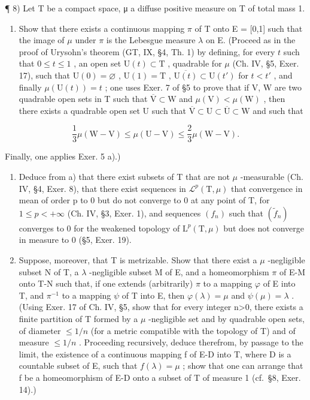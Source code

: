 ¶ 8) Let T be a compact space, μ a diffuse positive measure on T of total mass 1.

\begin{enumerate}
\def\labelenumi{\alph{enumi})}
\tightlist
\item
  Show that there exists a continuous mapping \(\pi\) of T onto E = {[}0,1{]} such that the image of \(\mu\) under \(\pi\) is the Lebesgue measure \(\lambda\) on E. (Proceed as in the proof of Urysohn's theorem (GT, IX, §4, Th. 1) by defining, for every \(t\) such that \(0 \leqslant t \leqslant 1\) , an open set \(\mathrm{U}(t) \subset \mathrm{T}\) , quadrable for \(\mu\) (Ch. IV, §5, Exer. 17), such that \(\mathrm{U}(0) = \varnothing\) , \(\mathrm{U}(1) = \mathrm{T}\) , \(\overline{\mathrm{U}(t)} \subset \mathrm{U}(t')\) for \(t < t'\) , and finally \(\mu(\mathrm{U}(t)) = t\) ; one uses Exer. 7 of §5 to prove that if V, W are two quadrable open sets in T such that \(\overline{\mathrm{V}} \subset \mathrm{W}\) and \(\mu(\mathrm{V}) < \mu(\mathrm{W})\) , then there exists a quadrable open set U such that \(\overline{\mathrm{V}} \subset \mathrm{U} \subset \overline{\mathrm{U}} \subset \mathrm{W}\) and such that
\end{enumerate}

\[
\frac {1}{3} \mu (\mathrm{W-V}) \leqslant \mu (\mathrm{U-V}) \leqslant \frac {2}{3} \mu (\mathrm{W-V}).
\]

Finally, one applies Exer. 5 a).)

\begin{enumerate}
\def\labelenumi{\alph{enumi})}
\setcounter{enumi}{1}
\item
  Deduce from a) that there exist subsets of T that are not \(\mu\) -measurable (Ch. IV, §4, Exer. 8), that there exist sequences in \(\mathcal{L}^{p}(\mathrm{T},\mu)\) that convergence in mean of order p to 0 but do not converge to 0 at any point of T, for \(1 \leqslant p < +\infty\) (Ch. IV, §3, Exer. 1), and sequences \((f_{n})\) such that \((\widetilde{f}_{n})\) converges to 0 for the weakened topology of \(\mathrm{L}^{p}(\mathrm{T},\mu)\) but does not converge in measure to 0 (§5, Exer. 19).
\item
  Suppose, moreover, that T is metrizable. Show that there exist a \(\mu\) -negligible subset N of T, a \(\lambda\) -negligible subset M of E, and a homeomorphism \(\pi\) of E-M onto T-N such that, if one extends (arbitrarily) \(\pi\) to a mapping \(\varphi\) of E into T, and \(\pi^{-1}\) to a mapping \(\psi\) of T into E, then \(\varphi(\lambda)=\mu\) and \(\psi(\mu)=\lambda\) . (Using Exer. 17 of Ch. IV, §5, show that for every integer n\textgreater0, there exists a finite partition of T formed by a \(\mu\) -negligible set and by quadrable open sets, of diameter \(\leqslant1/n\) (for a metric compatible with the topology of T) and of measure \(\leqslant1/n\) . Proceeding recursively, deduce therefrom, by passage to the limit, the existence of a continuous mapping f of E-D into T, where D is a countable subset of E, such that \(f(\lambda)=\mu\) ; show that one can arrange that f be a homeomorphism of E-D onto a subset of T of measure 1 (cf.~§8, Exer. 14).)
\end{enumerate}

